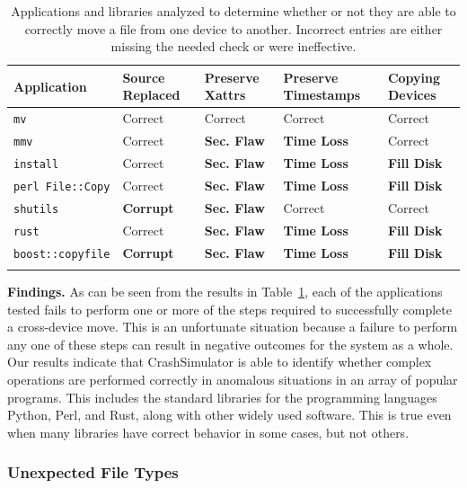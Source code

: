  \begin{table}[t]
    \scriptsize{}
    \begin{tabular}{l p{1cm} p{1cm} p{1.2cm} p{1cm}}
    \toprule{}
        Application     & Source Replaced & Preserve Xattrs & Preserve Timestamps & Copying Devices\\
\hline
        {\tt mv}              & Correct             & Correct         & Correct             & Correct\\
        {\tt mmv}             & Correct             & {\bf Sec. Flaw} & {\bf Time Loss} & Correct\\
        {\tt install}         & Correct             & {\bf Sec. Flaw} & {\bf Time Loss} & {\bf Fill Disk} \\
        {\tt perl File::Copy} & Correct             & {\bf Sec. Flaw} & {\bf Time Loss} & {\bf Fill Disk} \\
        {\tt shutils}         & {\bf Corrupt}	& {\bf Sec. Flaw} 	& Correct             & Correct\\
        {\tt rust}             & Correct             & {\bf Sec. Flaw} & {\bf Time Loss} & {\bf Fill Disk} \\
        {\tt boost::copyfile} & {\bf Corrupt}	      & {\bf Sec. Flaw} & {\bf Time Loss} & {\bf Fill Disk} \\
    \bottomrule{}
    \end{tabular}
    \caption{Applications and libraries analyzed to determine whether or not
      they are able to correctly move a file from one device to another.
Incorrect entries are either missing the needed check or were ineffective.}
    \label{table:crossdevice}
\end{table}

{\bf Findings.}
As can be seen from the results in Table~\ref{table:crossdevice}, each of the
applications tested fails to perform one or more of the steps required to
successfully complete a cross-device move.  This is an unfortunate situation
because a failure to perform any one of these steps can result in negative
outcomes for the system as a whole.
Our results indicate that CrashSimulator is able to identify whether complex
operations are performed correctly in anomalous situations in
an array of popular programs.
This includes the standard libraries for the programming languages Python,
Perl, and Rust, along with other widely used software.  This is true even
when many libraries have correct behavior in some cases, but not others.


\subsubsection{Unexpected File Types}
\label{sec-file-type-bugs}

